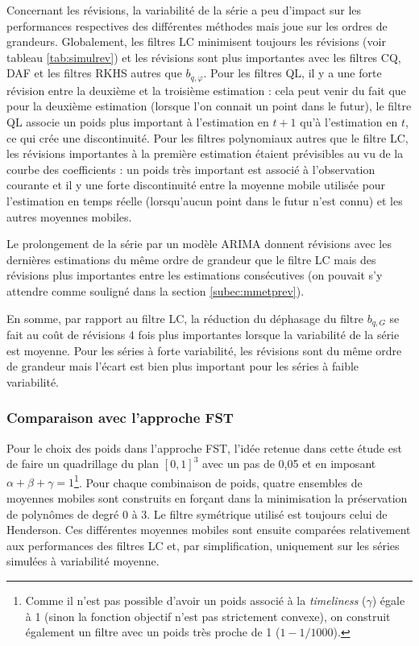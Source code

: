 \documentclass[
  12pt,
  a4paper,french]{article}
\newcommand\1{\mathds{1}}
\begin{document}
Concernant les révisions, la variabilité de la série a peu d'impact sur les performances respectives des différentes méthodes mais joue sur les ordres de grandeurs.
Globalement, les filtres LC minimisent toujours les révisions (voir tableau \ref{tab:simulrev}) et les révisions sont plus importantes avec les filtres CQ, DAF et les filtres RKHS autres que \(b_{q,\varphi}\).
Pour les filtres QL, il y a une forte révision entre la deuxième et la troisième estimation : cela peut venir du fait que pour la deuxième estimation (lorsque l'on connait un point dans le futur), le filtre QL associe un poids plus important à l'estimation en \(t+1\) qu'à l'estimation en \(t\), ce qui crée une discontinuité.
Pour les filtres polynomiaux autres que le filtre LC, les révisions importantes à la première estimation étaient prévisibles au vu de la courbe des coefficients : un poids très important est associé à l'observation courante et il y une forte discontinuité entre la moyenne mobile utilisée pour l'estimation en temps réelle (lorsqu'aucun point dans le futur n'est connu) et les autres moyennes mobiles.

Le prolongement de la série par un modèle ARIMA donnent révisions avec les dernières estimations du même ordre de grandeur que le filtre LC mais des révisions plus importantes entre les estimations consécutives (on pouvait s'y attendre comme souligné dans la section \ref{subec:mmetprev}).

En somme, par rapport au filtre LC, la réduction du déphasage du filtre \(b_{q,G}\) se fait au coût de révisions 4 fois plus importantes lorsque la variabilité de la série est moyenne.
Pour les séries à forte variabilité, les révisions sont du même ordre de grandeur mais l'écart est bien plus important pour les séries à faible variabilité.

\hypertarget{comparaison-avec-lapproche-fst}{%
\subsubsection{Comparaison avec l'approche FST}\label{comparaison-avec-lapproche-fst}}

Pour le choix des poids dans l'approche FST, l'idée retenue dans cette étude est de faire un quadrillage du plan \([0,1]^3\) avec un pas de 0,05 et en imposant \(\alpha + \beta + \gamma = 1\)\footnote{
  Comme il n'est pas possible d'avoir un poids associé à la \emph{timeliness} (\(\gamma\)) égale à 1 (sinon la fonction objectif n'est pas strictement convexe), on construit également un filtre avec un poids très proche de 1 (\(1-1/1000\)).}.
Pour chaque combinaison de poids, quatre ensembles de moyennes mobiles sont construits en forçant dans la minimisation la préservation de polynômes de degré 0 à 3.
Le filtre symétrique utilisé est toujours celui de Henderson.
Ces différentes moyennes mobiles sont ensuite comparées relativement aux performances des filtres LC et, par simplification, uniquement sur les séries simulées à variabilité moyenne.
\end{document}
